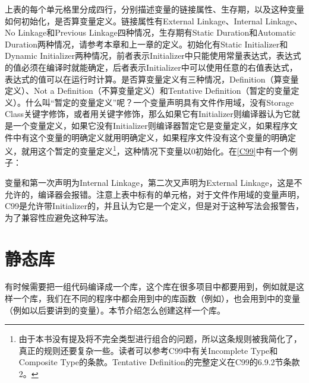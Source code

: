 上表的每个单元格里分成四行，分别描述变量的链接属性、生存期，以及这种变量如何初始化，是否算变量定义。链接属性有External Linkage、Internal Linkage、No Linkage和Previous Linkage四种情况，生存期有Static Duration和Automatic Duration两种情况，请参考本章和上一章的定义。初始化有Static Initializer和Dynamic Initializer两种情况，前者表示Initializer中只能使用常量表达式，表达式的值必须在编译时就能确定，后者表示Initializer中可以使用任意的右值表达式，表达式的值可以在运行时计算。是否算变量定义有三种情况，Definition（算变量定义）、Not a Definition（不算变量定义）和Tentative Definition（暂定的变量定义）。什么叫“暂定的变量定义”呢？一个变量声明具有文件作用域，没有Storage Class关键字修饰，或者用关键字修饰，那么如果它有Initializer则编译器认为它就是一个变量定义，如果它没有Initializer则编译器暂定它是变量定义，如果程序文件中有这个变量的明确定义就用明确定义，如果程序文件没有这个变量的明确定义，就用这个暂定的变量定义\footnote[32]{由于本书没有提及将不完全类型进行组合的问题，所以这条规则被我简化了，真正的规则还要复杂一些。读者可以参考C99中有关Incomplete Type和Composite Type的条款。Tentative Definition的完整定义在C99的6.9.2节条款2。}，这种情况下变量以0初始化。在\hyperlink{db.bi01.bibli.c99}{[C99]}中有一个例子：




变量和第一次声明为Internal Linkage，第二次又声明为External Linkage，这是不允许的，编译器会报错。注意上表中标有\BookCode{[\BookSplit{}*]\BookSplit{}}的单元格，对于文件作用域的变量声明，C99是允许带Initializer的，并且认为它是一个定义，但是对于这种写法会报警告，为了兼容性应避免这种写法。




\section{静态库}
%
有时候需要把一组代码编译成一个库，这个库在很多项目中都要用到，例如就是这样一个库，我们在不同的程序中都会用到中的库函数（例如），也会用到中的变量（例如以后要讲到的变量）。本节介绍怎么创建这样一个库。



